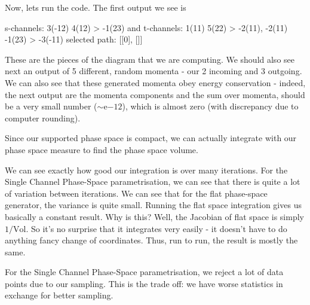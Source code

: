 Now, lets run the code. The first output we see is
\begin{codeenv}
    s-channels:     3(-12) 4(12) > -1(23)
and t-channels: 1(11) 5(22) > -2(11), -2(11) -1(23) > -3(-11)
selected path:  [[0], []]
\end{codeenv}
These are the pieces of the diagram that we are computing.
We should also see next an output of 5 different, random momenta - our 2 incoming and 3 outgoing. We can also see that these generated momenta obey energy conservation - indeed, the next output are the momenta components and the sum over momenta, should be a very small number ($\sim$e$-12$), which is almost zero (with discrepancy due to computer rounding).

Since our supported phase space is compact, we can actually integrate with our phase space measure to find the phase space volume.

We can see exactly how good our integration is over many iterations. For the Single Channel Phase-Space parametrisation, we can see that there is quite a lot of variation between iterations. We can see that for the flat phase-space generator, the variance is quite small.  Running the flat space integration gives us basically a constant result. Why is this? Well, the Jacobian of flat space is simply $1/\text{Vol}$. So it's no surprise that it integrates very easily - it doesn't have to do anything fancy change of coordinates. Thus, run to run, the result is mostly the same.

For the Single Channel Phase-Space parametrisation, we reject a lot of data points due to our sampling. This is the trade off: we have worse statistics in exchange for better sampling.

